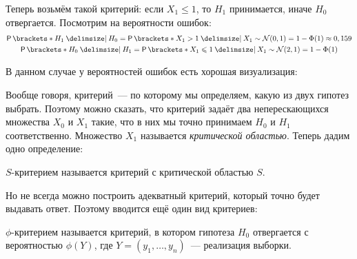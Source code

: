 Теперь возьмём такой критерий: если \(X_{1} \leq 1\), то \(H_{1}\) принимается, иначе \(H_{0}\) отвергается. Посмотрим на вероятности ошибок:
\begin{gather*}
	\Pr{H_{1} \given H_{0}} = \Pr{X_{1} > 1 \given X_{1} \sim \mathcal{N}(0, 1)} = 1 - \Phi(1) \approx 0,159 \\
	\Pr{H_{0} \given H_{1}} = \Pr{X_{1} \leq 1 \given X_{1} \sim \mathcal{N}(2, 1)} = 1 - \Phi(1)
\end{gather*}

В данном случае у вероятностей ошибок есть хорошая визуализация:
\begin{center}
\end{center}

Вообще говоря, критерий~--- по которому мы определяем, какую из двух гипотез выбрать. Поэтому можно сказать, что критерий задаёт два неперескающихся множества \(X_{0}\) и \(X_{1}\) такие, что в них мы точно принимаем \(H_{0}\) и \(H_{1}\) соответственно. Множество \(X_{1}\) называется \emph{критической областью}. Теперь дадим одно определение:
\begin{definition}
	\(S\)-критерием называется критерий с критической областью \(S\).
\end{definition}

Но не всегда можно построить адекватный критерий, который точно будет выдавать ответ. Поэтому вводится ещё один вид критериев:
\begin{definition}
	\(\phi\)-критерием называется критерий, в котором гипотеза \(H_{0}\) отвергается с вероятностью \(\phi(Y)\), где \(Y = (y_{1}, \dots, y_{n})\)~--- реализация выборки.
\end{definition}

